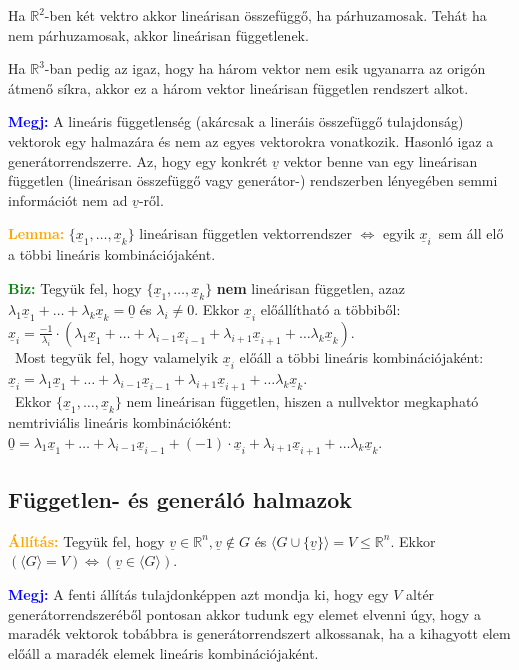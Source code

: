 \documentclass[../szamtud.tex]{subfiles}
\begin{document}
        Ha $\mathbb{R}^2$-ben két vektro akkor lineárisan összefüggő, ha párhuzamosak. Tehát ha nem párhuzamosak, akkor lineárisan függetlenek.

        Ha $\mathbb{R}^3$-ban pedig az igaz, hogy ha három vektor nem esik ugyanarra az origón átmenő síkra, akkor ez a három vektor lineárisan független rendszert alkot.

        \textcolor{blue}{\textbf{Megj:}} A lineáris függetlenség (akárcsak a lineráis összefüggő tulajdonság) vektorok egy halmazára és nem az egyes vektorokra vonatkozik. Hasonló igaz a generátorrendszerre. Az, hogy egy konkrét $\underline{v}$ vektor benne van egy lineárisan független (lineárisan összefüggő vagy generátor-) rendszerben lényegében semmi információt nem ad $\underline{v}$-ről.

        \textcolor{orange}{\textbf{Lemma:}} $\{\underline{x}_1, \dots, \underline{x}_k\}$ lineárisan független vektorrendszer $\Longleftrightarrow$ egyik $\underline{x}_i$ sem áll elő a többi lineáris kombinációjaként.

        \textcolor{green}{\textbf{Biz:}} Tegyük fel, hogy $\{\underline{x}_1, \dots, \underline{x}_k\}$ \textbf{nem} lineárisan független, azaz $\lambda_1\underline{x}_1 + \dots + \lambda_k \underline{x}_k = \underline{0}$ és $\lambda_i \neq 0$. Ekkor $\underline{x}_i$ előállítható a többiből: $\underline{x}_i = \frac{-1}{\lambda_i} \cdot (\lambda_1\underline{x}_1 + \dots + \lambda_{i-1}\underline{x}_{i-1} + \lambda_{i+1}\underline{x}_{i+1} + \dots \lambda_k \underline{x}_k)$. \\ Most tegyük fel, hogy valamelyik $\underline{x}_i$ előáll a többi lineáris kombinációjaként: $\underline{x}_i = \lambda_1\underline{x}_1 + \dots + \lambda_{i-1}\underline{x}_{i-1} + \lambda_{i+1}\underline{x}_{i+1} + \dots \lambda_k \underline{x}_k$. \\ Ekkor $\{\underline{x}_1, \dots, \underline{x}_k\}$ nem lineárisan független, hiszen a nullvektor megkapható nemtriviális lineáris kombinációként: $\underline{0} = \lambda_1\underline{x}_1 + \dots + \lambda_{i-1}\underline{x}_{i-1} + (-1) \cdot \underline{x}_i + \lambda_{i+1}\underline{x}_{i+1} + \dots \lambda_k \underline{x}_k$.

    \subsection{Független- és generáló halmazok}

        \textcolor{orange}{\textbf{Állítás:}} Tegyük fel, hogy $\underline{v} \in \mathbb{R}^n, \underline{v} \notin G$ és $\langle G \cup \{\underline{v}\} \rangle = V \leq \mathbb{R}^n$. Ekkor $(\langle G \rangle = V) \Longleftrightarrow (\underline{v} \in \langle G \rangle)$.

        \textcolor{blue}{\textbf{Megj:}} A fenti állítás tulajdonképpen azt mondja ki, hogy egy $V$ altér generátorrendszeréből pontosan akkor tudunk egy elemet elvenni úgy, hogy a maradék vektorok tobábbra is generátorrendszert alkossanak, ha a kihagyott elem előáll a maradék elemek lineáris kombinációjaként.
\end{document}
